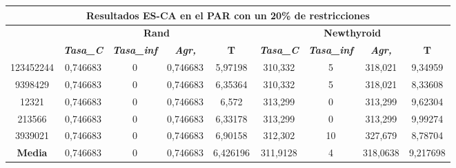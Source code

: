 \documentclass[12pt, spanish]{article}
\begin{document}
\begin{table}[H]
\begin{tabular}{|c|c|c|c|c|c|c|c|c|}
\hline
\multicolumn{9}{|c|}{\textbf{Resultados ES-CA en el PAR con un 20\% de restricciones}}                                                                                                                            \\ \hline
\multirow{2}{*}{} & \multicolumn{4}{c|}{\textbf{Rand}}                                                            & \multicolumn{4}{c|}{\textbf{Newthyroid}}                                                      \\ \cline{2-9} 
                  & \textit{\textbf{Tasa\_C}} & \textit{\textbf{Tasa\_inf}} & \textit{\textbf{Agr,}} & \textbf{T} & \textit{\textbf{Tasa\_C}} & \textit{\textbf{Tasa\_inf}} & \textit{\textbf{Agr,}} & \textbf{T} \\ \hline
123452244         & 0,746683                  & 0                           & 0,746683               & 5,97198    & 310,332                   & 5                           & 318,021                & 9,34959    \\ \hline
9398429           & 0,746683                  & 0                           & 0,746683               & 6,35364    & 310,332                   & 5                           & 318,021                & 8,33608    \\ \hline
12321             & 0,746683                  & 0                           & 0,746683               & 6,572      & 313,299                   & 0                           & 313,299                & 9,62304    \\ \hline
213566            & 0,746683                  & 0                           & 0,746683               & 6,33178    & 313,299                   & 0                           & 313,299                & 9,99274    \\ \hline
3939021           & 0,746683                  & 0                           & 0,746683               & 6,90158    & 312,302                   & 10                          & 327,679                & 8,78704    \\ \hline
\textbf{Media}    & 0,746683                  & 0                           & 0,746683               & 6,426196   & 311,9128                  & 4                           & 318,0638               & 9,217698   \\ \hline
\end{tabular}
\end{table}
\end{document}
